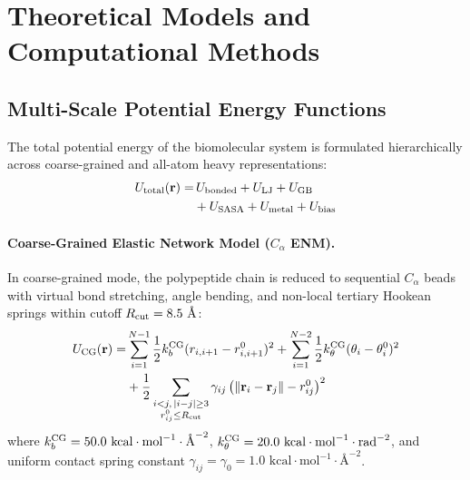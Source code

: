 \documentclass[journal=jpcbfk,manuscript=article,layout=twocolumn]{achemso}
\begin{document}
\section{Theoretical Models and Computational Methods}

\subsection{Multi-Scale Potential Energy Functions}
The total potential energy of the biomolecular system is formulated hierarchically across coarse-grained and all-atom heavy representations:
\begin{align}
U_{\rm total}(\mathbf{r}) = &\, U_{\rm bonded} + U_{\rm LJ} + U_{\rm GB} \nonumber \\
&+ U_{\rm SASA} + U_{\rm metal} + U_{\rm bias}
\end{align}

\paragraph{Coarse-Grained Elastic Network Model ($C_\alpha$ ENM).}
In coarse-grained mode, the polypeptide chain is reduced to sequential $C_\alpha$ beads with virtual bond stretching, angle bending, and non-local tertiary Hookean springs within cutoff $R_{\rm cut} = 8.5\text{ \AA}$:\cite{bahar1997vibrational,atilgan2001anisotropy}
\begin{align}
U_{\rm CG}(\mathbf{r}) = &\sum_{i=1}^{N-1} \frac{1}{2} k_b^{\rm CG} (r_{i,i+1} - r_{i,i+1}^0)^2 + \sum_{i=1}^{N-2} \frac{1}{2} k_\theta^{\rm CG} (\theta_i - \theta_i^0)^2 \nonumber \\
&+ \frac{1}{2} \sum_{\substack{i < j, \, |i-j| \ge 3 \\ r_{ij}^0 \le R_{\rm cut}}} \gamma_{ij} \left( \|\mathbf{r}_i - \mathbf{r}_j\| - r_{ij}^0 \right)^2
\end{align}
where $k_b^{\rm CG} = 50.0\text{ kcal}\cdot\text{mol}^{-1}\cdot\text{\AA}^{-2}$, $k_\theta^{\rm CG} = 20.0\text{ kcal}\cdot\text{mol}^{-1}\cdot\text{rad}^{-2}$, and uniform contact spring constant $\gamma_{ij} = \gamma_0 = 1.0\text{ kcal}\cdot\text{mol}^{-1}\cdot\text{\AA}^{-2}$.
\end{document}
